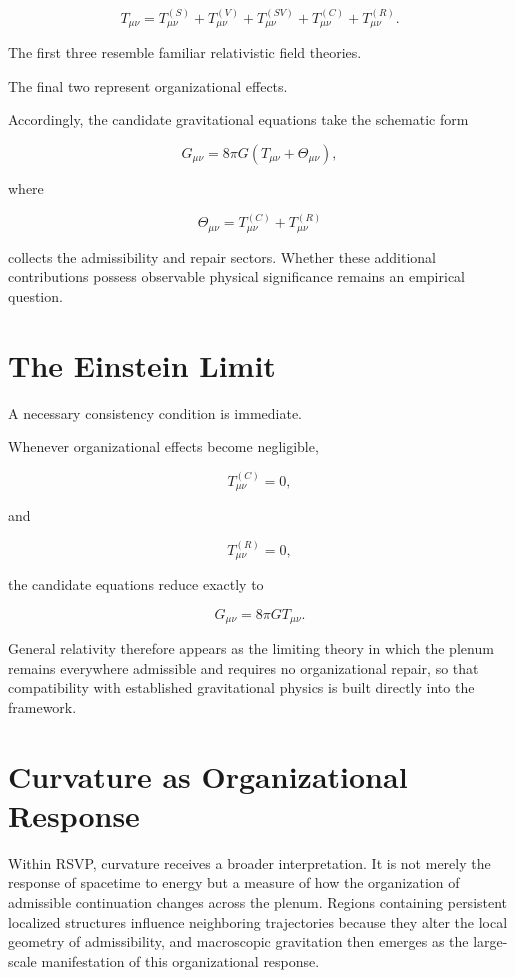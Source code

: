 \documentclass[11pt,oneside]{book}
\numberwithin{equation}{chapter}
\theoremstyle{definition}
\theoremstyle{plain}
\begin{document}
\[
T_{\mu\nu}
=
T^{(S)}_{\mu\nu}
+
T^{(V)}_{\mu\nu}
+
T^{(SV)}_{\mu\nu}
+
T^{(C)}_{\mu\nu}
+
T^{(R)}_{\mu\nu}.
\]

The first three resemble familiar relativistic field theories.

The final two represent organizational effects.

Accordingly, the candidate gravitational equations take the schematic form

\[
G_{\mu\nu}
=
8\pi G
\left(
T_{\mu\nu}
+
\Theta_{\mu\nu}
\right),
\]

where

\[
\Theta_{\mu\nu}
=
T^{(C)}_{\mu\nu}
+
T^{(R)}_{\mu\nu}
\]

collects the admissibility and repair sectors. Whether these additional contributions possess observable physical significance remains an empirical question.

\section{The Einstein Limit}

A necessary consistency condition is immediate.

Whenever organizational effects become negligible,

\[
T^{(C)}_{\mu\nu}=0,
\]

and

\[
T^{(R)}_{\mu\nu}=0,
\]

the candidate equations reduce exactly to

\[
G_{\mu\nu}
=
8\pi G
T_{\mu\nu}.
\]

General relativity therefore appears as the limiting theory in which the plenum remains everywhere admissible and requires no organizational repair, so that compatibility with established gravitational physics is built directly into the framework.

\section{Curvature as Organizational Response}

Within RSVP, curvature receives a broader interpretation. It is not merely the response of spacetime to energy but a measure of how the organization of admissible continuation changes across the plenum. Regions containing persistent localized structures influence neighboring trajectories because they alter the local geometry of admissibility, and macroscopic gravitation then emerges as the large-scale manifestation of this organizational response.
\end{document}
